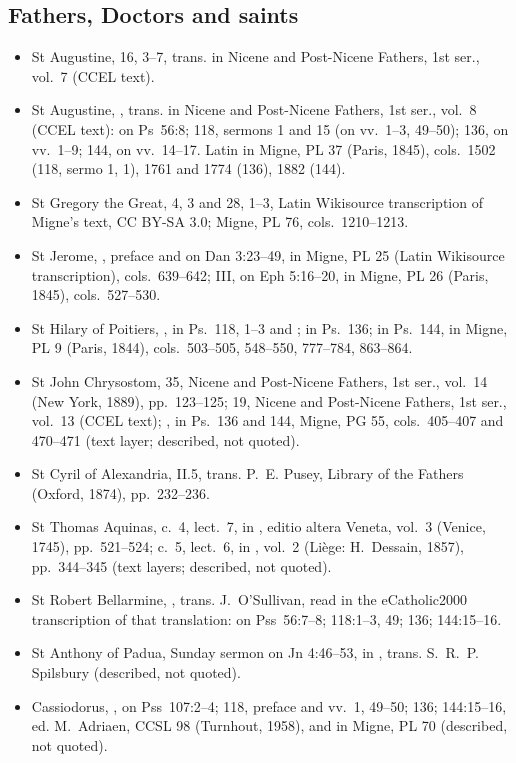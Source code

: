 {\subsection*{Fathers, Doctors and saints}
\begin{itemize}
\item St Augustine,  16, 3--7, trans. in Nicene and Post-Nicene Fathers, 1st ser., vol.~7 (CCEL text).
\item St Augustine, , trans. in Nicene and Post-Nicene Fathers, 1st ser., vol.~8 (CCEL text): on Ps~56:8; 118, sermons 1 and 15 (on vv.~1--3, 49--50); 136, on vv.~1--9; 144, on vv.~14--17. Latin in Migne, PL 37 (Paris, 1845), cols.~1502 (118, sermo 1, 1), 1761 and 1774 (136), 1882 (144).
\item St Gregory the Great,  4, 3 and 28, 1--3, Latin Wikisource transcription of Migne's text, CC BY-SA 3.0; Migne, PL 76, cols.~1210--1213.
\item St Jerome, , preface and on Dan 3:23--49, in Migne, PL 25 (Latin Wikisource transcription), cols.~639--642;  III, on Eph 5:16--20, in Migne, PL 26 (Paris, 1845), cols.~527--530.
\item St Hilary of Poitiers, , in Ps.~118,  1--3 and ; in Ps.~136; in Ps.~144, in Migne, PL 9 (Paris, 1844), cols.~503--505, 548--550, 777--784, 863--864.
\item St John Chrysostom,  35, Nicene and Post-Nicene Fathers, 1st ser., vol.~14 (New York, 1889), pp.~123--125;  19, Nicene and Post-Nicene Fathers, 1st ser., vol.~13 (CCEL text); , in Ps.~136 and 144, Migne, PG 55, cols.~405--407 and 470--471 (text layer; described, not quoted).
\item St Cyril of Alexandria,  II.5, trans. P.~E. Pusey, Library of the Fathers (Oxford, 1874), pp.~232--236.
\item St Thomas Aquinas,  c.~4, lect.~7, in , editio altera Veneta, vol.~3 (Venice, 1745), pp.~521--524;  c.~5, lect.~6, in , vol.~2 (Liège: H.~Dessain, 1857), pp.~344--345 (text layers; described, not quoted).
\item St Robert Bellarmine, , trans. J.~O'Sullivan, read in the eCatholic2000 transcription of that translation: on Pss~56:7--8; 118:1--3, 49; 136; 144:15--16.
\item St Anthony of Padua, Sunday sermon on Jn 4:46--53, in , trans. S.~R.~P. Spilsbury (described, not quoted).
\item Cassiodorus, , on Pss~107:2--4; 118, preface and vv.~1, 49--50; 136; 144:15--16, ed. M.~Adriaen, CCSL 98 (Turnhout, 1958), and in Migne, PL 70 (described, not quoted).
\end{itemize}

}
